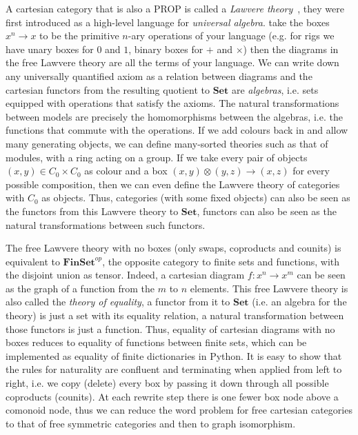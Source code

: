 A cartesian category that is also a PROP is called a \emph{Lawvere theory}~\cite{Lawvere63}, they were first introduced as a high-level language for \emph{universal algebra}. take the boxes $x^n \to x$ to be the primitive $n$-ary operations of your language (e.g. for rigs we have unary boxes for $0$ and $1$, binary boxes for $+$ and $\times$) then the diagrams in the free Lawvere theory are all the terms of your language.
We can write down any universally quantified axiom as a relation between diagrams and the cartesian functors from the resulting quotient to $\mathbf{Set}$ are \emph{algebras}, i.e. sets equipped with operations that satisfy the axioms.
The natural transformations between models are precisely the homomorphisms between the algebras, i.e. the functions that commute with the operations.
If we add colours back in and allow many generating objects, we can define many-sorted theories such as that of modules, with a ring acting on a group.
If we take every pair of objects $(x, y) \in C_0 \times C_0$ as colour and a box $(x, y) \otimes (y, z) \to (x, z)$ for every possible composition, then we can even define the Lawvere theory of categories with $C_0$ as objects.
Thus, categories (with some fixed objects) can also be seen as the functors from this Lawvere theory to $\mathbf{Set}$, functors can also be seen as the natural transformations between such functors.

The free Lawvere theory with no boxes (only swaps, coproducts and counits) is equivalent to $\mathbf{FinSet}^{op}$, the opposite category to finite sets and functions, with the disjoint union as tensor.
Indeed, a cartesian diagram $f : x^n \to x^m$ can be seen as the graph of a function from the $m$ to $n$ elements.
This free Lawvere theory is also called the \emph{theory of equality}, a functor from it to $\mathbf{Set}$ (i.e. an algebra for the theory) is just a set with its equality relation, a natural transformation between those functors is just a function.
Thus, equality of cartesian diagrams with no boxes reduces to equality of functions between finite sets, which can be implemented as equality of finite dictionaries in Python.
It is easy to show that the rules for naturality are confluent and terminating when applied from left to right, i.e. we copy (delete) every box by passing it down through all possible coproducts (counits).
At each rewrite step there is one fewer box node above a comonoid node, thus we can reduce the word problem for free cartesian categories to that of free symmetric categories and then to graph isomorphism.

